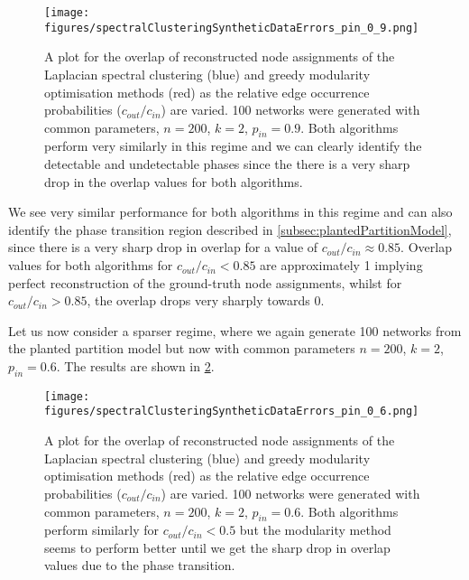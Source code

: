 \begin{figure}
	\centering
	\texttt{[image: figures/spectralClusteringSyntheticDataErrors\_pin\_0\_9.png]}
	\caption[Plot of overlap for spectral clustering and modularity methods in the dense regime.]{\label{fig:syntheticDataResultsPin0.9} A plot for the overlap of reconstructed node assignments of the Laplacian spectral clustering (blue) and greedy modularity optimisation methods (red) as the relative edge occurrence probabilities ($c_{out}/c_{in}$) are varied. 100 networks were generated with common parameters, $n=200$, $k=2$, $p_{in}=0.9$. Both algorithms perform very similarly in this regime and we can clearly identify the detectable and undetectable phases since the there is a very sharp drop in the overlap values for both algorithms.}
\end{figure}

We see very similar performance for both algorithms in this regime and can also identify the phase transition region described in \cref{subsec:plantedPartitionModel}, since there is a very sharp drop in overlap for a value of $c_{out}/c_{in} \approx 0.85$.
Overlap values for both algorithms for $c_{out}/c_{in} < 0.85$ are approximately 1 implying perfect reconstruction of the ground-truth node assignments, whilst for $c_{out}/c_{in} > 0.85$, the overlap drops very sharply towards 0.

Let us now consider a sparser regime, where we again generate 100 networks from the planted partition model but now with common parameters $n=200$, $k=2$, $p_{in}=0.6$.
The results are shown in \cref{fig:syntheticDataResultsPin0.6}.

\begin{figure}
	\centering
	\texttt{[image: figures/spectralClusteringSyntheticDataErrors\_pin\_0\_6.png]}
	\caption[Plot of overlap for spectral clustering and modularity methods in the sparse regime.]{\label{fig:syntheticDataResultsPin0.6} A plot for the overlap of reconstructed node assignments of the Laplacian spectral clustering (blue) and greedy modularity optimisation methods (red) as the relative edge occurrence probabilities ($c_{out}/c_{in}$) are varied. 100 networks were generated with common parameters, $n=200$, $k=2$, $p_{in}=0.6$. Both algorithms perform similarly for $c_{out}/c_{in} < 0.5$ but the modularity method seems to perform better until we get the sharp drop in overlap values due to the phase transition.}
\end{figure}

